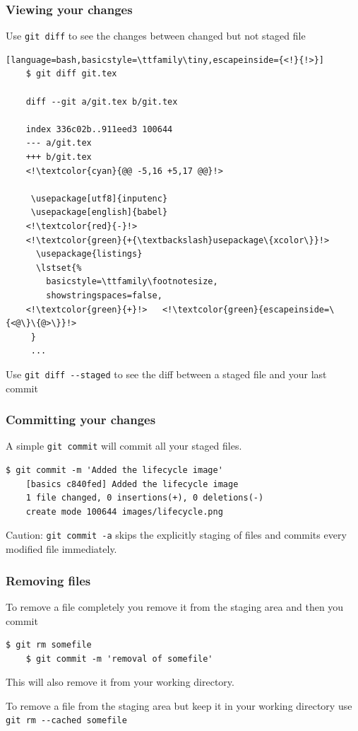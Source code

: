\documentclass{beamer}
\begin{document}
\begin{frame}[fragile]
  \frametitle{Viewing your changes}
  Use \lstinline{git diff} to see the changes between changed but not staged file
  \begin{lstlisting}[language=bash,basicstyle=\ttfamily\tiny,escapeinside={<!}{!>}]
    $ git diff git.tex

    diff --git a/git.tex b/git.tex

    index 336c02b..911eed3 100644
    --- a/git.tex
    +++ b/git.tex
    <!\textcolor{cyan}{@@ -5,16 +5,17 @@}!>
 
     \usepackage[utf8]{inputenc}
     \usepackage[english]{babel}
    <!\textcolor{red}{-}!>
    <!\textcolor{green}{+{\textbackslash}usepackage\{xcolor\}}!>
      \usepackage{listings}
      \lstset{%
        basicstyle=\ttfamily\footnotesize,
        showstringspaces=false,
    <!\textcolor{green}{+}!>   <!\textcolor{green}{escapeinside=\{<@\}\{@>\}}!>
     }
     ...
  \end{lstlisting}

  Use \lstinline{git diff --staged} to see the diff between a staged file and your last commit

\end{frame}

\begin{frame}[fragile]
  \frametitle{Committing your changes}
  A simple \lstinline{git commit} will commit all your staged files.

  \begin{lstlisting}[basicstyle=\ttfamily\tiny]
    $ git commit -m 'Added the lifecycle image'
    [basics c840fed] Added the lifecycle image
    1 file changed, 0 insertions(+), 0 deletions(-)
    create mode 100644 images/lifecycle.png
  \end{lstlisting}

  Caution: \lstinline{git commit -a} skips the explicitly staging of files
  and commits every modified file immediately.
\end{frame}

\begin{frame}[fragile]
  \frametitle{Removing files}
  To remove a file completely you remove it from the staging area and then you commit
  \begin{lstlisting}[basicstyle=\ttfamily\tiny]
    $ git rm somefile
    $ git commit -m 'removal of somefile'
  \end{lstlisting}
  This will also remove it from your working directory.

  To remove a file from the staging area but keep it in your working directory
  use \lstinline{git rm --cached somefile}
\end{frame}
\end{document}

